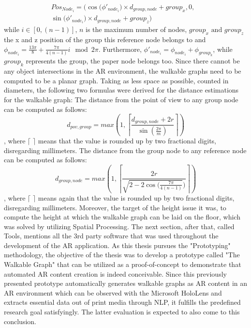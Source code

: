 \documentclass[12pt,a4paper,oneside,american,parskip=half]{article}
\begin{document}
\begin{justify}
\begin{normalsize}
\begin{align*}
Pos_{Node_{i}} = \Big(\cos \big(\phi'_{node_{i}}\big) \times d_{group,node} + group_x, 0, & \\ 
\sin \big(\phi'_{node_{i}}\big) \times d_{group,node} + group_z \Big) &
\end{align*} while $ i \in [0, (n - 1)]$, $n$ is the maximum number of nodes, $group_x \text{ and } group_z$ the x and z position of the group this reference node belongs to and $\phi_{node_{i}} = \frac{13\pi}{8} + \frac{7\pi}{4(n - 1)}i \mod 2\pi$. Furthermore, $\phi'_{node_{i}} = \phi_{node_{i}} + \phi_{group_k}$, while $group_k$ represents the group, the paper node belongs too.
\newline
Since there cannot be any object intersections in the AR environment, the walkable graphs need to be computed to be a planar graph. Taking as less space as possible, counted in diameters, the following two formulas were derived for the distance estimations for the walkable graph:
\newline
The distance from the point of view to any group node can be computed as follows:
\begin{equation}
d_{pov, group} = max \left(1, \left\lceil \frac{d_{group, node} + 2r}{\sin(\frac{2\pi}{m})} \right\rceil \right)
\end{equation}
, where $\lceil$  $\rceil$ means that the value is rounded up by two fractional digits, disregarding millimeters.
\newline
The distance from the group node to any reference node can be computed as follows:
\begin{equation}
d_{group, node} = max \left(1, \left\lceil \frac{2r}{\sqrt{2 - 2\cos\big(\frac{7\pi}{4(n - 1)}}\big)} \right\rceil \right)
\end{equation}
, where $\lceil$  $\rceil$ means again that the value is rounded up by two fractional digits, disregarding millimeters.
\newline
Moreover, the target of the height issue it was, to compute the height at which the walkable graph can be laid on the floor, which was solved by utilizing Spatial Processing.
\newline
The next section, after that, called Tools, mentions all the 3rd party software that was used throughout the development of the AR application.
As this thesis pursues the "Prototyping" methodology, the objective of the thesis was to develop a prototype called "The Walkable Graph" that can be utilized as a proof-of-concept to demonstrate that automated AR content creation is indeed conceivable.
\newline
Since this previously presented prototype automatically generates walkable graphs as AR content in an AR environment which can be observed with the Microsoft HoloLens and extracts essential data out of print media through NLP, it fulfills the predefined research goal satisfyingly.
The latter evaluation is expected to also come to this conclusion.



\end{normalsize}
\end{justify}
\end{document}
